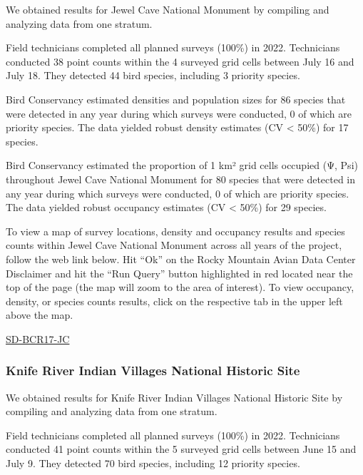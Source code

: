 \documentclass[
  letterpaper,
  DIV=11,
  numbers=noendperiod,
  oneside]{scrreprt}
\begin{document}
We obtained results for Jewel Cave National Monument by compiling and
analyzing data from one stratum.

Field technicians completed all planned surveys (100\%) in 2022.
Technicians conducted 38 point counts within the 4 surveyed grid cells
between July 16 and July 18. They detected 44 bird species, including 3
priority species.

Bird Conservancy estimated densities and population sizes for 86 species
that were detected in any year during which surveys were conducted, 0 of
which are priority species. The data yielded robust density estimates
(CV \textless{} 50\%) for 17 species.

Bird Conservancy estimated the proportion of 1 km² grid cells occupied
(Ψ, Psi) throughout Jewel Cave National Monument for 80 species that
were detected in any year during which surveys were conducted, 0 of
which are priority species. The data yielded robust occupancy estimates
(CV \textless{} 50\%) for 29 species.

To view a map of survey locations, density and occupancy results and
species counts within Jewel Cave National Monument across all years of
the project, follow the web link below. Hit ``Ok'' on the Rocky Mountain
Avian Data Center Disclaimer and hit the ``Run Query'' button
highlighted in red located near the top of the page (the map will zoom
to the area of interest). To view occupancy, density, or species counts
results, click on the respective tab in the upper left above the map.

\href{http://www.rmbo.org/new_site/adc/QueryWindow.aspx\#N4IgzgLgTghhCuBbEAuABCAygEQLQCEBhAJQEYB2XAKUPSoFMB3egGzUJgDd60A5OAJYB7AHYw2AWVFJ6IiCAC+QA===}{SD-BCR17-JC}

\hypertarget{knife-river-indian-villages-national-historic-site}{%
\subsubsection{Knife River Indian Villages National Historic
Site}\label{knife-river-indian-villages-national-historic-site}}

We obtained results for Knife River Indian Villages National Historic
Site by compiling and analyzing data from one stratum.

Field technicians completed all planned surveys (100\%) in 2022.
Technicians conducted 41 point counts within the 5 surveyed grid cells
between June 15 and July 9. They detected 70 bird species, including 12
priority species.
\end{document}
